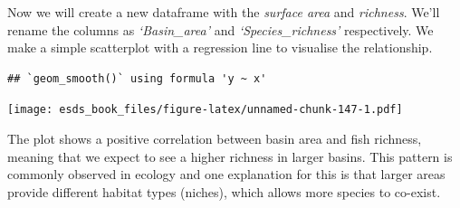 \documentclass[
]{book}
\newenvironment{Shaded}{\begin{snugshade}}{\end{snugshade}}
\newcommand{\DataTypeTok}[1]{\textcolor[rgb]{0.13,0.29,0.53}{#1}}
\newcommand{\DecValTok}[1]{\textcolor[rgb]{0.00,0.00,0.81}{#1}}
\newcommand{\FloatTok}[1]{\textcolor[rgb]{0.00,0.00,0.81}{#1}}
\newcommand{\KeywordTok}[1]{\textcolor[rgb]{0.13,0.29,0.53}{\textbf{#1}}}
\newcommand{\NormalTok}[1]{#1}
\newcommand{\OperatorTok}[1]{\textcolor[rgb]{0.81,0.36,0.00}{\textbf{#1}}}
\newcommand{\OtherTok}[1]{\textcolor[rgb]{0.56,0.35,0.01}{#1}}
\newcommand{\StringTok}[1]{\textcolor[rgb]{0.31,0.60,0.02}{#1}}
\begin{document}
Now we will create a new dataframe with the \emph{surface area} and \emph{richness}. We'll rename the columns as \emph{`Basin\_area'} and \emph{`Species\_richness'} respectively. We make a simple scatterplot with a regression line to visualise the relationship.

\begin{Shaded}
\end{Shaded}

\begin{verbatim}
## `geom_smooth()` using formula 'y ~ x'
\end{verbatim}

\texttt{[image: esds\_book\_files/figure-latex/unnamed-chunk-147-1.pdf]}

The plot shows a positive correlation between basin area and fish richness, meaning that we expect to see a higher richness in larger basins. This pattern is commonly observed in ecology and one explanation for this is that larger areas provide different habitat types (niches), which allows more species to co-exist.
\end{document}
